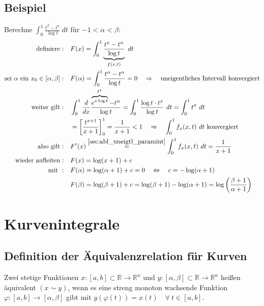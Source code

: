 \documentclass[11pt,a4paper]{book}
\newcommand {\R}	{\mathbb{R}}
\newcommand {\Rn}	{\mathbb{R}^n}
\newcommand{\1}    	{\mathbbm{1}}
\newcommand{\mitt}	{\textrm{ mit }}
\begin{document}
\subsection{Beispiel}
Berechne \(\int_0^1 \frac{t^\beta - t^\alpha}{\log t} ~dt \) für \(-1 < \alpha < \beta\):
\begin{align*}
	\textrm{definiere}:&\quad F(x) = \int_0^1 \underbrace{\frac{t^x - t^\alpha}{\log t}}_{f(x,t)} ~dt \\
	\textrm{sei } \alpha \textrm{ ein } x_0 \in [\alpha,\beta]:&\quad
	F(\alpha) = \int_0^1 \frac{t^\alpha - t^\alpha}{\log t} = 0 \quad \Rightarrow\quad \textrm{uneigentliches Intervall konvergiert} \\
	\textrm{weiter gilt}:&\quad
	\int_0^1 \frac{d}{dx} \frac{ \overbrace{e^{x\log t}}^{t^x} - t^\alpha}{\log t} = \int_0^1 \frac{\log t \cdot t^x}{\log t}~dt = \int_0^1 t^x ~dt \\
	&\quad = \left[ \frac{t^{x+1}}{x+1} \right]_0^1 = \frac{1}{x+1} < 1 \quad\Rightarrow\quad \int_0^1 f_x(x,t) ~dt \textrm{ konvergiert} \\
	\textrm{also gilt}:&\quad F'(x) \stackrel{\ref{sec:abl_uneigtl_paramint}}{=} \int_0^1 f_x(x,t) ~dt = \frac{1}{x+1} \\
	\textrm{wieder aufleiten}:&\quad F(x) = \log(x+1) + c \\
	\mitt: &\quad F(\alpha) = \log(\alpha + 1) + c = 0 
	\quad\Leftrightarrow\quad c = -\log(\alpha+1) \\
	&\quad F(\beta) = \log(\beta + 1) + c = \log(\beta + 1) - \log(\alpha + 1) = \log\left(\frac{\beta+1}{\alpha+1}\right)
\end{align*}

\section{Kurvenintegrale}

\subsection{Definition der Äquivalenzrelation für Kurven}
Zwei stetige Funktionen \(x:[a,b] \subset \R \rightarrow \Rn\) und \(y:[\alpha,\beta] \subset \R \rightarrow \Rn\) heißen äquivalent \((x \sim y)\), wenn es eine streng monoton wachsende Funktion \(\varphi:[a,b] \rightarrow [\alpha,\beta]\) gibt mit \(y(\varphi(t)) = x(t) \quad \forall~ t \in [a,b]\).\\
\end{document}
